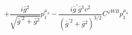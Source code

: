 %
\begin{dmath*}
%
  +  \frac{i {\bar g}{}^2}{\sqrt{{\bar g}^{\prime 2} + {\bar g}{}^2}}p_1^{\mu_3}  -  \frac{i {\bar g}^\prime {\bar g}{}^3 v^2}{\left({\bar g}^{\prime 2} + {\bar g}{}^2\right)^{3/2}}C^{ \varphi  WB} p_1^{\mu_3}
%
\end{dmath*}
%
